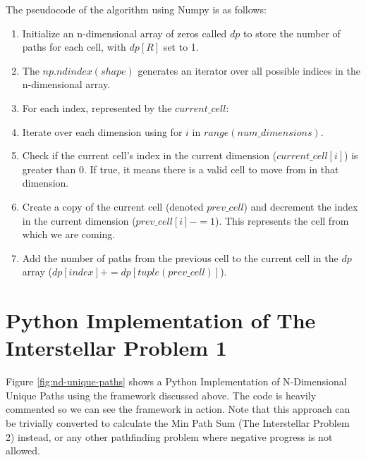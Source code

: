 The pseudocode of the algorithm using Numpy is as follows:

\begin{enumerate}
    \item Initialize an n-dimensional array of zeros called $dp$ to store the number of paths for each cell, with $dp[R]$ set to 1.
    \item The $np.ndindex(shape)$ generates an iterator over all possible indices in the n-dimensional array.
    \item For each index, represented by the $current\_cell$:
    \item Iterate over each dimension using for $i$ in $range(num\_dimensions)$.
    \item Check if the current cell's index in the current dimension ($current\_cell[i]$) is greater than 0. If true, it means there is a valid cell to move from in that dimension.
    \item Create a copy of the current cell (denoted $prev\_cell$) and decrement the index in the current dimension ($prev\_cell[i] -= 1$). This represents the cell from which we are coming.
    \item Add the number of paths from the previous cell to the current cell in the $dp$ array ($dp[index] += dp[tuple(prev\_cell)]$).

\end{enumerate}

\section{Python Implementation of The Interstellar Problem 1}

Figure \ref{fig:nd-unique-paths} shows a Python Implementation of N-Dimensional Unique Paths using the framework discussed above.
The code is heavily commented so we can see the framework in action. Note that this approach can be trivially converted to calculate the Min Path Sum (The Interstellar Problem 2) instead, or any other pathfinding problem where negative progress is not allowed.

